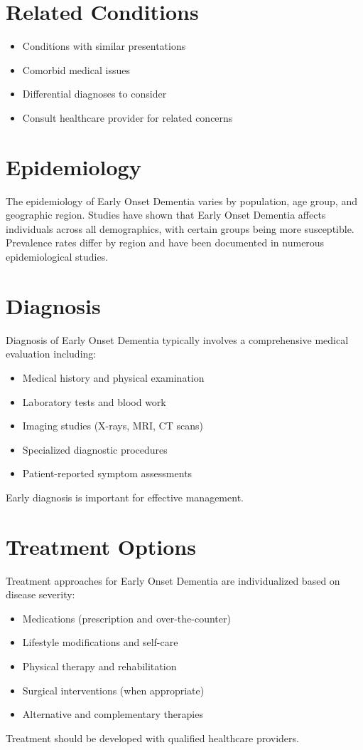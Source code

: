 \section*{Related Conditions}
\begin{itemize}
  \item Conditions with similar presentations
  \item Comorbid medical issues
  \item Differential diagnoses to consider
  \item Consult healthcare provider for related concerns
\end{itemize}

\section*{Epidemiology}
The epidemiology of Early Onset Dementia varies by population, age group, and geographic region. Studies have shown that Early Onset Dementia affects individuals across all demographics, with certain groups being more susceptible. Prevalence rates differ by region and have been documented in numerous epidemiological studies.

\section*{Diagnosis}
Diagnosis of Early Onset Dementia typically involves a comprehensive medical evaluation including:
\begin{itemize}
  \item Medical history and physical examination
  \item Laboratory tests and blood work
  \item Imaging studies (X-rays, MRI, CT scans)
  \item Specialized diagnostic procedures
  \item Patient-reported symptom assessments
\end{itemize}
Early diagnosis is important for effective management.

\section*{Treatment Options}
Treatment approaches for Early Onset Dementia are individualized based on disease severity:
\begin{itemize}
  \item Medications (prescription and over-the-counter)
  \item Lifestyle modifications and self-care
  \item Physical therapy and rehabilitation
  \item Surgical interventions (when appropriate)
  \item Alternative and complementary therapies
\end{itemize}
Treatment should be developed with qualified healthcare providers.

